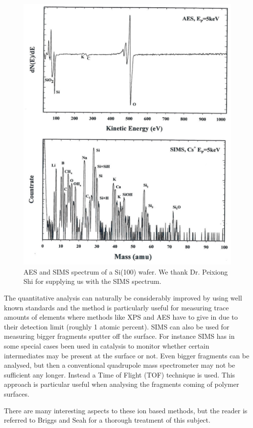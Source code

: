 \begin{figure}[h!]
	\begin{center}
	\includegraphics[scale=4]{figures/11_07.png}
	\caption{AES and SIMS spectrum of a Si(100) wafer. We thank Dr. Peixiong Shi for supplying us with the SIMS spectrum.}
	\label{fig:siaessims}
	\end{center}
\end{figure}

The quantitative analysis can naturally be considerably improved by using well known standards and the method is particularly useful for measuring trace amounts of elements where methods like XPS and AES have to give in due to their detection limit (roughly 1 atomic percent). SIMS can also be used for measuring bigger fragments sputter off the surface. For instance SIMS has in some special cases been used in catalysis to monitor whether certain intermediates may be present at the surface or not. Even bigger fragments can be analysed, but then a conventional quadrupole mass spectrometer may not be sufficient any longer. Instead a Time of Flight  (TOF) technique is used. This approach is particular useful when analysing the fragments coming of polymer surfaces.

There are many interesting aspects to these ion based methods, but the reader is referred to Briggs and Seah for a thorough treatment \cite{briggs2} of this subject.